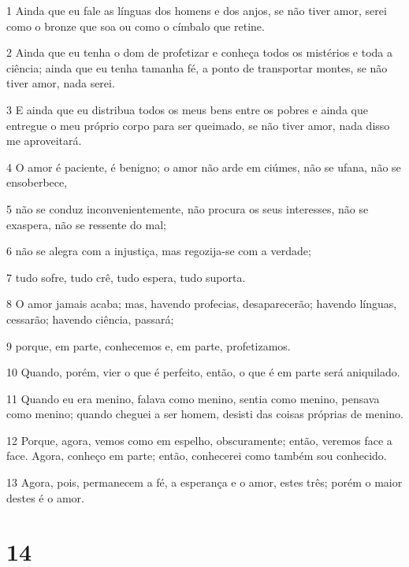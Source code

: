 \par 1 Ainda que eu fale as línguas dos homens e dos anjos, se não tiver amor, serei como o bronze que soa ou como o címbalo que retine.
\par 2 Ainda que eu tenha o dom de profetizar e conheça todos os mistérios e toda a ciência; ainda que eu tenha tamanha fé, a ponto de transportar montes, se não tiver amor, nada serei.
\par 3 E ainda que eu distribua todos os meus bens entre os pobres e ainda que entregue o meu próprio corpo para ser queimado, se não tiver amor, nada disso me aproveitará.
\par 4 O amor é paciente, é benigno; o amor não arde em ciúmes, não se ufana, não se ensoberbece,
\par 5 não se conduz inconvenientemente, não procura os seus interesses, não se exaspera, não se ressente do mal;
\par 6 não se alegra com a injustiça, mas regozija-se com a verdade;
\par 7 tudo sofre, tudo crê, tudo espera, tudo suporta.
\par 8 O amor jamais acaba; mas, havendo profecias, desaparecerão; havendo línguas, cessarão; havendo ciência, passará;
\par 9 porque, em parte, conhecemos e, em parte, profetizamos.
\par 10 Quando, porém, vier o que é perfeito, então, o que é em parte será aniquilado.
\par 11 Quando eu era menino, falava como menino, sentia como menino, pensava como menino; quando cheguei a ser homem, desisti das coisas próprias de menino.
\par 12 Porque, agora, vemos como em espelho, obscuramente; então, veremos face a face. Agora, conheço em parte; então, conhecerei como também sou conhecido.
\par 13 Agora, pois, permanecem a fé, a esperança e o amor, estes três; porém o maior destes é o amor.

\chapter{14}

